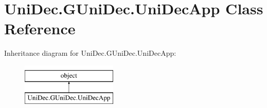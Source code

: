 \hypertarget{class_uni_dec_1_1_g_uni_dec_1_1_uni_dec_app}{}\section{Uni\+Dec.\+G\+Uni\+Dec.\+Uni\+Dec\+App Class Reference}
\label{class_uni_dec_1_1_g_uni_dec_1_1_uni_dec_app}
Inheritance diagram for Uni\+Dec.\+G\+Uni\+Dec.\+Uni\+Dec\+App\+:\begin{figure}[H]
\begin{center}
\leavevmode
\includegraphics[height=2.000000cm]{class_uni_dec_1_1_g_uni_dec_1_1_uni_dec_app}
\end{center}
\end{figure}
